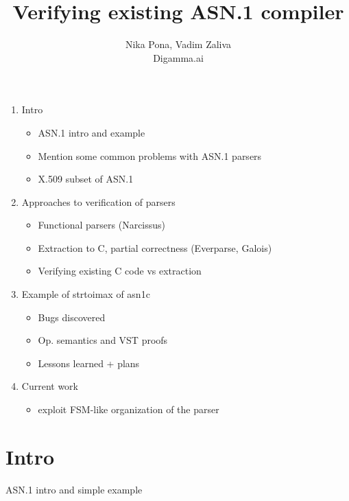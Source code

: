 \documentclass{article}
\begin{document}
\title{Verifying existing ASN.1 compiler}

\author{Nika Pona, Vadim Zaliva \\
        Digamma.ai}

\maketitle

\begin{abstract}

\end{abstract}
\begin{enumerate}

\item Intro
  \begin{itemize}
  \item ASN.1 intro and example 
  \item Mention some common problems with ASN.1 parsers
    \item X.509 subset of ASN.1
  \end{itemize}
\item Approaches to verification of parsers
  \begin{itemize}
  \item Functional parsers (Narcissus)
  \item Extraction to C, partial correctness (Everparse, Galois)
   \item Verifying existing C code vs extraction
  \end{itemize}
  \item Example of strtoimax of asn1c
\begin{itemize}
\item Bugs discovered
  \item Op. semantics and VST proofs
  \item Lessons learned + plans
  \end{itemize}
\item Current work
  \begin{itemize}
  \item exploit FSM-like organization of the parser
    \end{itemize}

\end{enumerate}

\section{Intro}
 ASN.1 intro and simple example 
\end{document}
